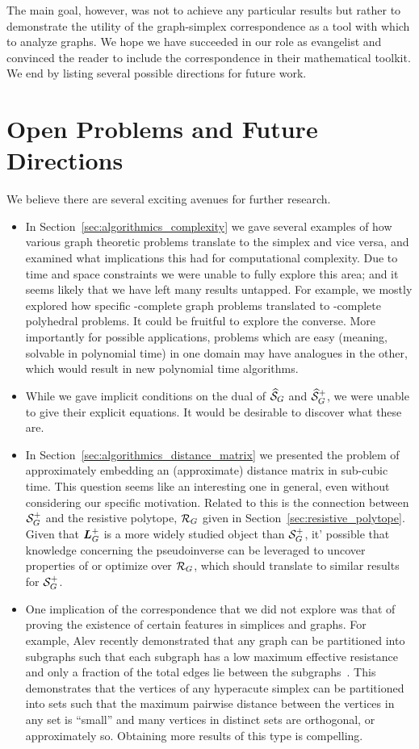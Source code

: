The main goal,  however,  was not to achieve any particular results but rather to demonstrate the utility of  the graph-simplex correspondence as  a tool with which  to  analyze  graphs. We hope we have succeeded in our role as evangelist and  convinced the reader to include the correspondence in their mathematical toolkit. We end  by listing several possible directions for future work. 

\section{Open Problems and Future Directions}
\label{sec:open_problems}

We believe there are several exciting  avenues for further  research. 
\begin{itemize}
	\item In Section~\ref{sec:algorithmics_complexity} we gave several  examples of how various graph  theoretic problems translate to the simplex and vice  versa, and examined what implications this had for computational complexity. Due to time and space constraints we were unable to fully explore this area; and it seems likely that we have left many  results untapped.  For example, we mostly explored how specific \NP-complete graph problems translated to \NP-complete polyhedral problems. It could be fruitful to explore the converse. More importantly for possible applications, problems which are easy (meaning, solvable in polynomial time) in one domain may have analogues  in the other, which would result in new polynomial  time  algorithms. 
	\item While  we gave implicit conditions on the  dual of $\widehat{\mathcal{S}}_G$ and $\widehat{\mathcal{S}}_G^+$, we were unable to give their explicit equations. It  would be desirable to discover what these are.   
	\item In Section~\ref{sec:algorithmics_distance_matrix} we presented the problem of approximately embedding an (approximate) distance matrix  in sub-cubic time. This question  seems like an interesting one in general, even without considering our specific motivation. Related to  this is the  connection  between  $\mathcal{S}_G^+$  and the resistive polytope,  $\mathcal{R}_G$ given in Section~\ref{sec:resistive_polytope}.  Given that $\vb*{L}_G^+$ is a more widely  studied object than $\mathcal{S}_G^+$, it' possible that knowledge concerning  the  pseudoinverse can be leveraged  to uncover properties of or optimize over  $\mathcal{R}_G$,  which should  translate to similar results  for $\mathcal{S}_G^+$. 	
	\item One implication  of  the correspondence that  we did not explore  was  that of proving the existence of  certain features in simplices and graphs.  For example, Alev \etal recently demonstrated that any graph  can be partitioned into subgraphs such that  each subgraph has a low maximum effective resistance  and only a fraction of the total edges lie between the subgraphs~\cite{alev2017graph}. This demonstrates that the vertices of any hyperacute simplex can be partitioned into  sets  such that the maximum pairwise distance between the vertices in any set is ``small'' and many  vertices  in distinct sets are orthogonal, or approximately so. 
	Obtaining more results  of  this type is compelling.  


\end{itemize}
